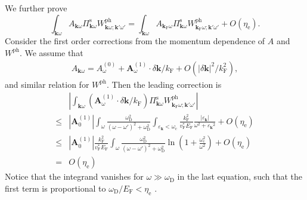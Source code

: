 \documentclass[%
 reprint,
superscriptaddress,
 amsmath,amssymb,
 aps,
prx,
]{revtex4-2}
\newcommand{\bk}{\mathbf{k}}
\newcommand{\txc}{\text{c}}
\newcommand{\txe}{\text{e}}
\newcommand{\txs}{\text{s}}
\newcommand{\txD}{\text{D}}
\newcommand{\txF}{\text{F}}
\newcommand{\txph}{\text{ph}}
\begin{document}
\begin{appendices}
We further prove
\begin{equation}
\label{eq:pis_to_kF}
    \int_{\bk\omega} A_{\bk\omega}\Pi^{\txs}_{\bk\omega}W^{\txph}_{\bk\omega;\bk'\omega'} = \int_{\bk\omega} A_{\bk_{\txF} \omega}\Pi^{\txs}_{\bk\omega}W^{\txph}_{\bk_{\txF} \omega;\bk'\omega'} + O(\eta_\txe).
\end{equation}
Consider the first order corrections 
from the momentum dependence of $A$ and $W^{\txph}$. We assume that 
\begin{eqnarray}
    A_{\bk\omega} = A^{(0)}_{\omega}+{\mathbf{A}}^{(1)}_{\omega}\cdot{\delta\bk}/k_{\txF} + O({|\delta\bk|^2/k_{\txF}^2}),
\end{eqnarray}
and similar relation for $W^{\txph}$. Then the leading correction is 
\begin{equation}
\begin{split}
 &\left|\int_{\bk\omega} (\mathbf{A}^{(1)}_{\omega}\cdot\delta{\bk}/k_\txF)\Pi^{\txs}_{\bk\omega}W^{\txph}_{\bk_{\txF} \omega;\bk'\omega'}\right|\\
 \le &|\mathbf{A}^{(1)}_{0}| \int_{\omega} \frac{\omega_\txD^2}{(\omega-\omega')^2+\omega_\txD^2}
 \int_{\varepsilon_\bk<\omega_\txc}\frac{k_\txF^2}{v_\txF^*E_\txF}\frac{|\varepsilon_\bk|}{\omega^2+{\varepsilon_{\bk}}^2}+O(\eta_\txe)\\
  \le &|\mathbf{A}^{(1)}_{0}|\frac{k_\txF^2}{v_\txF^*E_\txF}
  \int_{\omega} \frac{\omega_\txD^2}{(\omega-\omega')^2+\omega_\txD^2} \ln\left(1+\frac{\omega_\txc^2}{\omega^2}\right)+O(\eta_\txe)\\
 =&O(\eta_\txe)
\end{split}
\end{equation}
Notice that the integrand vanishes for $\omega \gg \omega_\txD$ in the last equation, such that the first term is proportional to $\omega_\txD/E_\txF<\eta_\txe$ .


\end{appendices}
\end{document}

